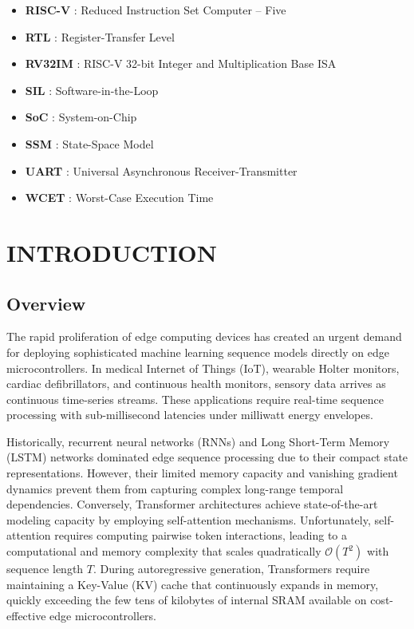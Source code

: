 \documentclass[11pt,a4paper,oneside]{report}
\begin{document}
\begin{itemize}[itemsep=0pt]
  \item[]\textbf{RISC-V}  : Reduced Instruction Set Computer -- Five
  \item[]\textbf{RTL}     : Register-Transfer Level
  \item[]\textbf{RV32IM}  : RISC-V 32-bit Integer and Multiplication Base ISA
  \item[]\textbf{SIL}     : Software-in-the-Loop
  \item[]\textbf{SoC}     : System-on-Chip
  \item[]\textbf{SSM}     : State-Space Model
  \item[]\textbf{UART}    : Universal Asynchronous Receiver-Transmitter
  \item[]\textbf{WCET}    : Worst-Case Execution Time
\end{itemize}
\clearpage


\chapter{INTRODUCTION}
\label{Chapter1}
\rhead{}
\renewcommand{\footrulewidth}{0.4pt}

\section{Overview}
The rapid proliferation of edge computing devices has created an urgent demand for deploying sophisticated machine learning sequence models directly on edge microcontrollers. In medical Internet of Things (IoT), wearable Holter monitors, cardiac defibrillators, and continuous health monitors, sensory data arrives as continuous time-series streams. These applications require real-time sequence processing with sub-millisecond latencies under milliwatt energy envelopes.

Historically, recurrent neural networks (RNNs) and Long Short-Term Memory (LSTM) networks dominated edge sequence processing due to their compact state representations. However, their limited memory capacity and vanishing gradient dynamics prevent them from capturing complex long-range temporal dependencies. Conversely, Transformer architectures achieve state-of-the-art modeling capacity by employing self-attention mechanisms. Unfortunately, self-attention requires computing pairwise token interactions, leading to a computational and memory complexity that scales quadratically $\mathcal{O}(T^2)$ with sequence length $T$. During autoregressive generation, Transformers require maintaining a Key-Value (KV) cache that continuously expands in memory, quickly exceeding the few tens of kilobytes of internal SRAM available on cost-effective edge microcontrollers.
\end{document}

